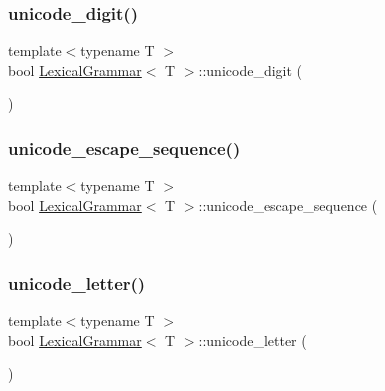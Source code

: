 \mbox{\label{class_lexical_grammar_a20b4e0f9757bcace278e8d711efb09da}} 
\subsubsection{\texorpdfstring{unicode\+\_\+digit()}{unicode\_digit()}}
{\footnotesize\ttfamily template$<$typename T $>$ \\
bool \hyperlink{class_lexical_grammar}{Lexical\+Grammar}$<$ T $>$\+::unicode\+\_\+digit (\begin{DoxyParamCaption}{ }\end{DoxyParamCaption})\hspace{0.3cm}{\ttfamily [inline]}}

\mbox{\label{class_lexical_grammar_a411dd476c213ddb338a80766596d0d74}} 
\subsubsection{\texorpdfstring{unicode\+\_\+escape\+\_\+sequence()}{unicode\_escape\_sequence()}}
{\footnotesize\ttfamily template$<$typename T $>$ \\
bool \hyperlink{class_lexical_grammar}{Lexical\+Grammar}$<$ T $>$\+::unicode\+\_\+escape\+\_\+sequence (\begin{DoxyParamCaption}{ }\end{DoxyParamCaption})\hspace{0.3cm}{\ttfamily [inline]}}

\mbox{\label{class_lexical_grammar_aee36e7e578912a00215f3a66778c191f}} 
\subsubsection{\texorpdfstring{unicode\+\_\+letter()}{unicode\_letter()}}
{\footnotesize\ttfamily template$<$typename T $>$ \\
bool \hyperlink{class_lexical_grammar}{Lexical\+Grammar}$<$ T $>$\+::unicode\+\_\+letter (\begin{DoxyParamCaption}{ }\end{DoxyParamCaption})\hspace{0.3cm}{\ttfamily [inline]}}

